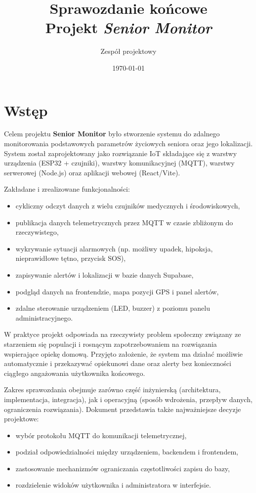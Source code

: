 \documentclass[a4paper,12pt]{article}
\title{Sprawozdanie końcowe\\Projekt \textit{Senior Monitor}}
\author{Zespół projektowy}
\date{\today}
\begin{document}
\maketitle
\tableofcontents
\newpage

\section{Wstęp}
Celem projektu \textbf{Senior Monitor} było stworzenie systemu do zdalnego monitorowania podstawowych parametrów życiowych seniora oraz jego lokalizacji. System został zaprojektowany jako rozwiązanie IoT składające się z warstwy urządzenia (ESP32 + czujniki), warstwy komunikacyjnej (MQTT), warstwy serwerowej (Node.js) oraz aplikacji webowej (React/Vite).

Zakładane i zrealizowane funkcjonalności:
\begin{itemize}
  \item cykliczny odczyt danych z wielu czujników medycznych i środowiskowych,
  \item publikacja danych telemetrycznych przez MQTT w czasie zbliżonym do rzeczywistego,
  \item wykrywanie sytuacji alarmowych (np. możliwy upadek, hipoksja, nieprawidłowe tętno, przycisk SOS),
  \item zapisywanie alertów i lokalizacji w bazie danych Supabase,
  \item podgląd danych na frontendzie, mapa pozycji GPS i panel alertów,
  \item zdalne sterowanie urządzeniem (LED, buzzer) z poziomu panelu administracyjnego.
\end{itemize}

W praktyce projekt odpowiada na rzeczywisty problem społeczny związany ze starzeniem się populacji i rosnącym zapotrzebowaniem na rozwiązania wspierające opiekę domową. Przyjęto założenie, że system ma działać możliwie automatycznie i przekazywać opiekunowi dane oraz alerty bez konieczności ciągłego angażowania użytkownika końcowego.

Zakres sprawozdania obejmuje zarówno część inżynierską (architektura, implementacja, integracja), jak i operacyjną (sposób wdrożenia, przepływ danych, ograniczenia rozwiązania). Dokument przedstawia także najważniejsze decyzje projektowe:
\begin{itemize}
  \item wybór protokołu MQTT do komunikacji telemetrycznej,
  \item podział odpowiedzialności między urządzeniem, backendem i frontendem,
  \item zastosowanie mechanizmów ograniczania częstotliwości zapisu do bazy,
  \item rozdzielenie widoków użytkownika i administratora w interfejsie.
\end{itemize}
\end{document}

